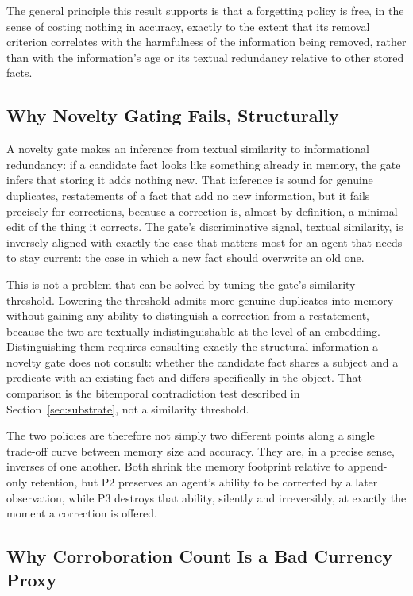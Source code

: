 The general principle this result supports is that a forgetting policy is free, in the sense of costing nothing in accuracy, exactly to the extent that its removal criterion correlates with the harmfulness of the information being removed, rather than with the information's age or its textual redundancy relative to other stored facts.

\subsection{Why Novelty Gating Fails, Structurally}
\label{sec:why-novelty-fails}

A novelty gate makes an inference from textual similarity to informational redundancy: if a candidate fact looks like something already in memory, the gate infers that storing it adds nothing new. That inference is sound for genuine duplicates, restatements of a fact that add no new information, but it fails precisely for corrections, because a correction is, almost by definition, a minimal edit of the thing it corrects. The gate's discriminative signal, textual similarity, is inversely aligned with exactly the case that matters most for an agent that needs to stay current: the case in which a new fact should overwrite an old one.

This is not a problem that can be solved by tuning the gate's similarity threshold. Lowering the threshold admits more genuine duplicates into memory without gaining any ability to distinguish a correction from a restatement, because the two are textually indistinguishable at the level of an embedding. Distinguishing them requires consulting exactly the structural information a novelty gate does not consult: whether the candidate fact shares a subject and a predicate with an existing fact and differs specifically in the object. That comparison is the bitemporal contradiction test described in Section~\ref{sec:substrate}, not a similarity threshold.

The two policies are therefore not simply two different points along a single trade-off curve between memory size and accuracy. They are, in a precise sense, inverses of one another. Both shrink the memory footprint relative to append-only retention, but P2 preserves an agent's ability to be corrected by a later observation, while P3 destroys that ability, silently and irreversibly, at exactly the moment a correction is offered.

\subsection{Why Corroboration Count Is a Bad Currency Proxy}
\label{sec:why-corroboration-bad}


